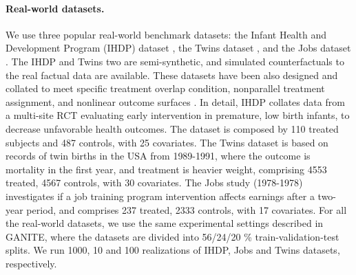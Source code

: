 \documentclass{amia}
\begin{document}



\paragraph{Real-world datasets.} 
We use three popular real-world benchmark datasets: the Infant Health and Development Program (IHDP) dataset \cite{hill2011bayesian}, the Twins dataset \cite{almond2005costs}, and the Jobs dataset \cite{lalonde1986evaluating}. The IHDP and Twins two are semi-synthetic, and simulated counterfactuals to the real factual data are available. These datasets have been also designed and collated to meet specific treatment overlap condition, nonparallel treatment assignment, and nonlinear outcome surfaces \cite{hill2011bayesian, pmlr-v70-shalit17a, louizos2017causal, Yoon2018}. In detail, IHDP collates data from a multi-site RCT evaluating early intervention in premature, low birth infants, to decrease unfavorable health outcomes. The dataset is composed by 110 treated subjects and 487 controls, with 25 covariates. The Twins dataset is based on records of twin births in the USA from 1989-1991, where the outcome is mortality in the first year, and treatment is heavier weight, comprising 4553 treated, 4567 controls, with 30 covariates. The Jobs study (1978-1978) investigates if a job training program intervention affects earnings after a two-year period, and comprises 237 treated, 2333 controls, with 17 covariates. For all the real-world datasets, we use the same experimental settings described in GANITE, where the datasets are divided into 56/24/20 \% train-validation-test splits. We run 1000, 10 and 100 realizations of IHDP, Jobs and Twins datasets, respectively. 
\end{document}
